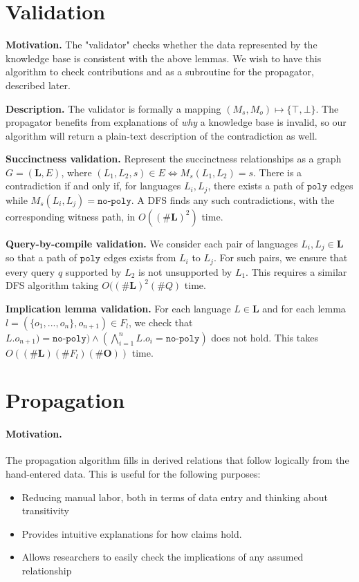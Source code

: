 \documentclass[10pt]{article}
\theoremstyle{plain}
\theoremstyle{definition}
\theoremstyle{remark}
\begin{document}
\section{Validation}

\textbf{Motivation.} The "validator" checks whether the data represented by the knowledge base is consistent with the above lemmas. We wish to have this algorithm to check contributions and as a subroutine for the propagator, described later.

\textbf{Description.} The validator is formally a mapping $(M_s, M_o) \mapsto \{\top, \bot\}$. The propagator benefits from explanations of \emph{why} a knowledge base is invalid, so our algorithm will return a plain-text description of the contradiction as well.


\textbf{Succinctness validation.} Represent the succinctness relationships as a graph $G = (\textbf{L}, E)$, where $(L_1, L_2, s) \in E \iff M_s(L_1, L_2) = s$. There is a contradiction if and only if, for languages $L_i, L_j$, there exists a path of $\texttt{poly}$ edges while $M_s(L_i, L_j) = \texttt{no-poly}$. A DFS finds any such contradictions, with the corresponding witness path, in $O((\#\textbf{L})^2)$ time.

\textbf{Query-by-compile validation.} We consider each pair of languages $L_i, L_j \in \textbf{L}$ so that a path of $\texttt{poly}$ edges exists from $L_i$ to $L_j$. For such pairs, we ensure that every query $q$ supported by $L_2$ is not unsupported by $L_1$. This requires a similar DFS algorithm taking $O((\#\textbf{L})^2(\#Q)$ time.

\textbf{Implication lemma validation.} For each language $L \in \textbf{L}$ and for each lemma $l=(\{o_1, ..., o_n\}, o_{n+1}) \in F_l$, we check that $L.o_{n+1})=\texttt{no-poly}) \wedge (\bigwedge_{i=1}^n  L.o_i=\texttt{no-poly})$ does not hold. This takes $O((\#\textbf{L})(\#F_l)(\#\textbf{O}))$ time.

\section{Propagation}

\paragraph{Motivation.} The propagation algorithm fills in derived relations that follow logically from the hand-entered data. This is useful for the following purposes:
\begin{itemize}
    \item{Reducing manual labor, both in terms of data entry and thinking about transitivity}
    \item{Provides intuitive explanations for how claims hold.}
    \item{Allows researchers to easily check the implications of any assumed relationship}
\end{itemize}
\end{document}
